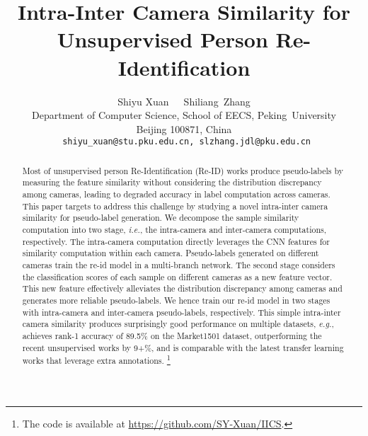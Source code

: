\documentclass[final]{cvpr}
\begin{document}
\title{Intra-Inter Camera Similarity for Unsupervised Person Re-Identification}

\author{Shiyu Xuan \ \quad Shiliang Zhang\\
Department of Computer Science, School of EECS, Peking University\\
Beijing 100871, China\\
{\tt\small shiyu\_xuan@stu.pku.edu.cn, slzhang.jdl@pku.edu.cn}
}


\maketitle

\pagestyle{empty}  \thispagestyle{empty} \begin{abstract}
\renewcommand{\thefootnote}{}

Most of unsupervised person Re-Identification (Re-ID) works produce pseudo-labels by measuring the feature similarity without considering the distribution discrepancy among cameras, leading to degraded accuracy in label computation across cameras. This paper targets to address this challenge by studying a novel intra-inter camera similarity for pseudo-label generation. We decompose the sample similarity computation into two stage, \emph{i.e.}, the intra-camera and inter-camera computations, respectively. The intra-camera computation directly leverages the CNN features for similarity computation within each camera. Pseudo-labels generated on different cameras train the re-id model in a multi-branch network. The second stage considers the classification scores of each sample on different cameras as a new feature vector. This new feature effectively alleviates the distribution discrepancy among cameras and generates more reliable pseudo-labels. We hence train our re-id model in two stages with intra-camera and inter-camera pseudo-labels, respectively. This simple intra-inter camera similarity produces surprisingly good performance on multiple datasets, \emph{e.g.}, achieves rank-1 accuracy of 89.5\% on the Market1501 dataset, outperforming the recent unsupervised works by 9+\%, and is comparable with the latest transfer learning works that leverage extra annotations. \footnote{The code is available at \url{https://github.com/SY-Xuan/IICS}.}
 	
\end{abstract}
\end{document}
